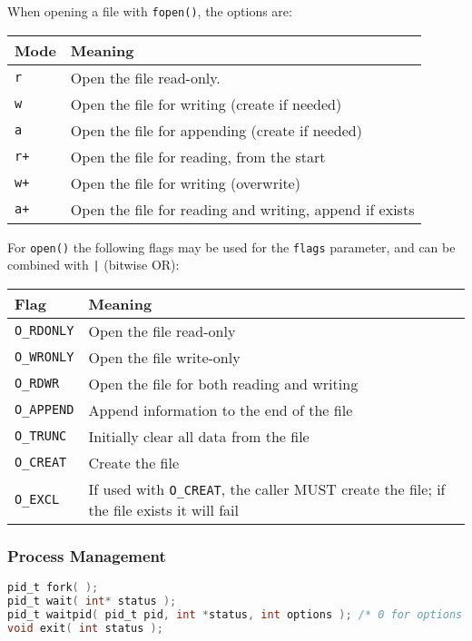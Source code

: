 \documentclass[legalpaper,10pt]{article}
\begin{document}
When opening a file with \texttt{fopen()}, the options are:\\
\begin{tabular}{l|l}
	\textbf{Mode} & \textbf{Meaning} \\ \hline
	\texttt{r} & Open the file read-only. \\ \hline
	\texttt{w} & Open the file for writing (create if needed) \\ \hline
	\texttt{a} & Open the file for appending (create if needed) \\ \hline
	\texttt{r+} & Open the file for reading, from the start \\ \hline
	\texttt{w+} & Open the file for writing (overwrite) \\ \hline
	\texttt{a+} & Open the file for reading and writing, append if exists \\
\end{tabular}


For \texttt{open()} the following flags may be used for the \texttt{flags} parameter, and can be combined with \texttt{|} (bitwise OR):\\
\begin{tabular}{l|l}
	\textbf{Flag} & \textbf{Meaning} \\ \hline
	\texttt{O\_RDONLY} & Open the file read-only \\ \hline
	\texttt{O\_WRONLY} & Open the file write-only \\ \hline
	\texttt{O\_RDWR} & Open the file for both reading and writing \\ \hline
	\texttt{O\_APPEND} & Append information to the end of the file \\ \hline
	\texttt{O\_TRUNC} & Initially clear all data from the file \\ \hline
	\texttt{O\_CREAT} & Create the file \\ \hline	
	\texttt{O\_EXCL} & If used with \texttt{O\_CREAT}, the caller MUST create the file; if the file exists it will fail \\ 	
\end{tabular}


\subsubsection*{Process Management}

\begin{lstlisting}[language=C]
pid_t fork( );
pid_t wait( int* status );
pid_t waitpid( pid_t pid, int *status, int options ); /* 0 for options fine */
void exit( int status );
\end{lstlisting}
\end{document}
